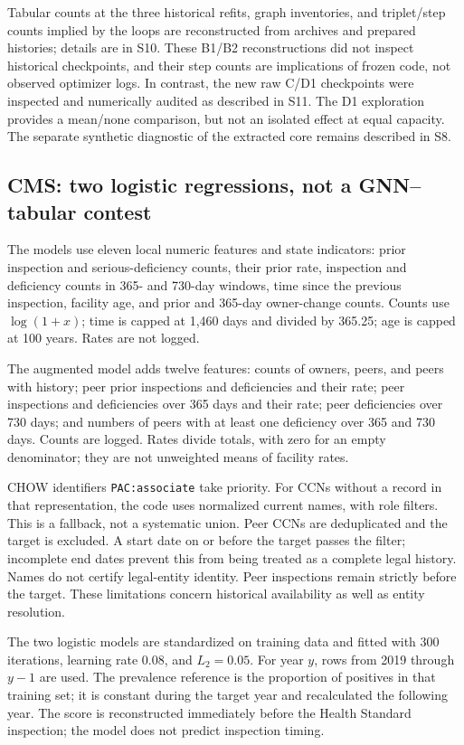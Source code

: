 \documentclass[10pt,a4paper]{article}
\newcommand{\src}[1]{{\small\nolinkurl{#1}}}
\begin{document}
Tabular counts at the three historical refits, graph inventories, and triplet/step counts implied by the loops are reconstructed from archives and prepared histories; details are in S10. These B1/B2 reconstructions did not inspect historical checkpoints, and their step counts are implications of frozen code, not observed optimizer logs. In contrast, the new raw C/D1 checkpoints were inspected and numerically audited as described in S11. The D1 exploration provides a mean/none comparison, but not an isolated effect at equal capacity. The separate synthetic diagnostic of the extracted core remains described in S8\cite{hgbcode,hgbresults,hamilton2017}.

\subsection{CMS: two logistic regressions, not a GNN--tabular contest}
The models use eleven local numeric features and state indicators: prior inspection and serious-deficiency counts, their prior rate, inspection and deficiency counts in 365- and 730-day windows, time since the previous inspection, facility age, and prior and 365-day owner-change counts. Counts use $\log(1+x)$; time is capped at 1,460 days and divided by 365.25; age is capped at 100 years. Rates are not logged.

The augmented model adds twelve features: counts of owners, peers, and peers with history; peer prior inspections and deficiencies and their rate; peer inspections and deficiencies over 365 days and their rate; peer deficiencies over 730 days; and numbers of peers with at least one deficiency over 365 and 730 days. Counts are logged. Rates divide totals, with zero for an empty denominator; they are not unweighted means of facility rates.

CHOW identifiers \src{PAC:associate} take priority. For CCNs without a record in that representation, the code uses normalized current names, with role filters. This is a fallback, not a systematic union. Peer CCNs are deduplicated and the target is excluded. A start date on or before the target passes the filter; incomplete end dates prevent this from being treated as a complete legal history. Names do not certify legal-entity identity. Peer inspections remain strictly before the target. These limitations concern historical availability as well as entity resolution\cite{hgbcode}.

The two logistic models are standardized on training data and fitted with 300 iterations, learning rate 0.08, and $L_2=0.05$. For year $y$, rows from 2019 through $y-1$ are used. The prevalence reference is the proportion of positives in that training set; it is constant during the target year and recalculated the following year. The score is reconstructed immediately before the Health Standard inspection; the model does not predict inspection timing.
\end{document}
